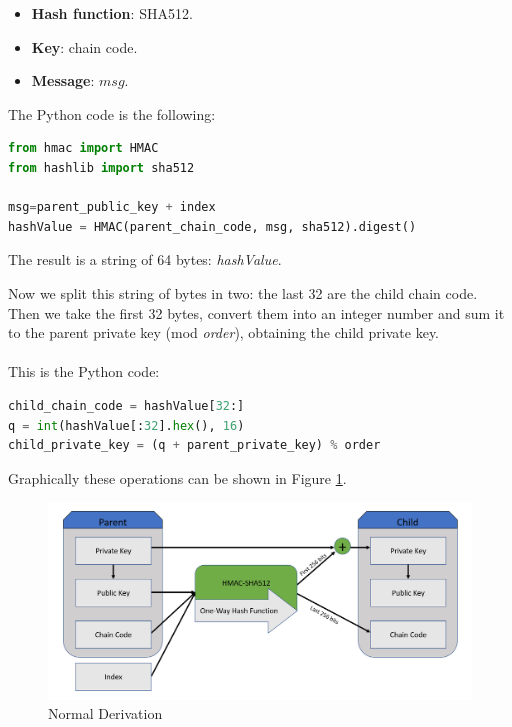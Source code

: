 \begin{itemize}[label=$\odot$]
	\item \textbf{Hash function}: SHA512.
	\item \textbf{Key}: chain code.
	\item \textbf{Message}: $msg$.
\end{itemize}
The Python code is the following:
\begin{lstlisting}[language=Python]
from hmac import HMAC
from hashlib import sha512

msg=parent_public_key + index
hashValue = HMAC(parent_chain_code, msg, sha512).digest()
\end{lstlisting}
\begin{flushleft}
	The result is a string of 64 bytes: \textit{hashValue}.
\end{flushleft}
Now we split this string of bytes in two: the last 32 are the child chain code. Then we take the first 32 bytes, convert them into an integer number and sum it to the parent private key (mod \textit{order}), obtaining the child private key.\\ \\
This is the Python code:

\begin{lstlisting}[language=Python]
child_chain_code = hashValue[32:]
q = int(hashValue[:32].hex(), 16)
child_private_key = (q + parent_private_key) % order
\end{lstlisting}

\begin{flushleft}
	Graphically these operations can be shown in Figure \ref{fig:normal_derivation}.
\end{flushleft}

\begin{figure}[ht!]
	\centering
	\includegraphics[width=14.5cm]{Figures/normal_derivation_v2.png}
	\caption{Normal Derivation }
	\label{fig:normal_derivation}
\end{figure}


